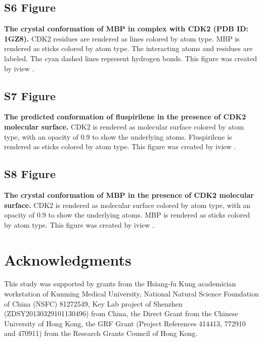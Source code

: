 \documentclass[10pt,letterpaper]{article}
\begin{document}
\subsection*{S6 Figure}
\label{S6_Figure}
{\bf The crystal conformation of MBP in complex with CDK2 (PDB ID: 1GZ8).} CDK2 residues are rendered as lines colored by atom type. MBP is rendered as sticks colored by atom type. The interacting atoms and residues are labeled. The cyan dashed lines represent hydrogen bonds. This figure was created by iview \cite{1366}.%

\subsection*{S7 Figure}
\label{S7_Figure}
{\bf The predicted conformation of fluspirilene in the presence of CDK2 molecular surface.} CDK2 is rendered as molecular surface colored by atom type, with an opacity of 0.9 to show the underlying atoms. Fluspirilene is rendered as sticks colored by atom type. This figure was created by iview \cite{1366}.%

\subsection*{S8 Figure}
\label{S8_Figure}
{\bf The crystal conformation of MBP in the presence of CDK2 molecular surface.} CDK2 is rendered as molecular surface colored by atom type, with an opacity of 0.9 to show the underlying atoms. MBP is rendered as sticks colored by atom type. This figure was created by iview \cite{1366}.%

\section*{Acknowledgments}

This study was supported by grants from the Hsiang-fu Kung academician workstation of Kunming Medical University, National Natural Science Foundation of China (NSFC) 81272549, Key Lab project of Shenzhen (ZDSY20130329101130496) from China, the Direct Grant from the Chinese University of Hong Kong, the GRF Grant (Project References 414413, 772910 and 470911) from the Research Grants Council of Hong Kong.
\end{document}
